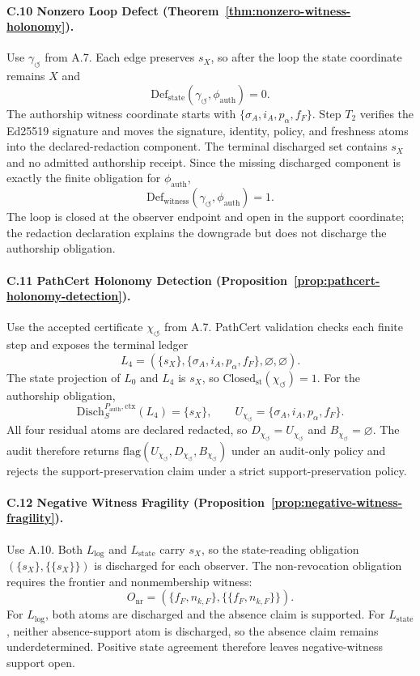 \documentclass[11pt,twoside]{article}
\theoremstyle{definition}
\newcommand{\Disch}{\mathrm{Disch}}
\newcommand{\Def}{\mathrm{Def}}
\newcommand{\ctx}{\mathrm{ctx}}
\begin{document}
\paragraph{C.10 Nonzero Loop Defect (Theorem~\ref{thm:nonzero-witness-holonomy}).}
Use $\gamma_{\circlearrowleft}$ from A.7. Each edge preserves $s_X$, so after
the loop the state coordinate remains $X$ and
\[
  \Def_{\mathrm{state}}(\gamma_{\circlearrowleft},\phi_{\mathrm{auth}})=0.
\]
The authorship witness coordinate starts with
$\{\sigma_A,i_A,p_\alpha,f_F\}$. Step $T_2$ verifies the Ed25519 signature and
moves the signature, identity, policy, and freshness atoms into the
declared-redaction component. The terminal discharged set contains $s_X$ and no admitted
authorship receipt. Since the missing discharged component is exactly the finite
obligation for $\phi_{\mathrm{auth}}$,
\[
  \Def_{\mathrm{witness}}(\gamma_{\circlearrowleft},\phi_{\mathrm{auth}})=1.
\]
The loop is closed at the observer endpoint and open in the support coordinate;
the redaction declaration explains the downgrade but does not discharge the
authorship obligation.

\paragraph{C.11 PathCert Holonomy Detection (Proposition~\ref{prop:pathcert-holonomy-detection}).}
Use the accepted certificate $\chi_{\circlearrowleft}$ from A.7. PathCert
validation checks each finite step and exposes the terminal ledger
\[
  L_4=(\{s_X\},\{\sigma_A,i_A,p_\alpha,f_F\},\varnothing,\varnothing).
\]
The state projection of $L_0$ and $L_4$ is $s_X$, so
$\mathrm{Closed}_{\mathrm{st}}(\chi_{\circlearrowleft})=1$. For the authorship
obligation,
\[
  \Disch_S^{P_{\mathrm{auth}},\ctx}(L_4)=\{s_X\},
  \qquad
  U_{\chi_{\circlearrowleft}}=\{\sigma_A,i_A,p_\alpha,f_F\}.
\]
All four residual atoms are declared redacted, so
$D_{\chi_{\circlearrowleft}}=U_{\chi_{\circlearrowleft}}$ and
$B_{\chi_{\circlearrowleft}}=\varnothing$. The audit therefore returns
$\mathrm{flag}(U_{\chi_{\circlearrowleft}},D_{\chi_{\circlearrowleft}},
B_{\chi_{\circlearrowleft}})$ under an audit-only policy and rejects the
support-preservation claim under a strict support-preservation policy.

\paragraph{C.12 Negative Witness Fragility (Proposition~\ref{prop:negative-witness-fragility}).}
Use A.10. Both $L_{\log}$ and $L_{\mathrm{state}}$ carry $s_X$, so the
state-reading obligation $(\{s_X\},\{\{s_X\}\})$ is discharged for each
observer. The non-revocation obligation requires the frontier and nonmembership
witness:
\[
  O_{\mathrm{nr}}=(\{f_F,n_{k,F}\},\{\{f_F,n_{k,F}\}\}).
\]
For $L_{\log}$, both atoms are discharged and the absence claim is supported.
For $L_{\mathrm{state}}$, neither absence-support atom is discharged, so the
absence claim remains underdetermined. Positive state agreement therefore leaves
negative-witness support open.
\end{document}
